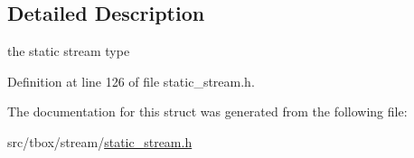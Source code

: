 \subsection{Detailed Description}
the static stream type 

Definition at line 126 of file static\-\_\-stream.\-h.



The documentation for this struct was generated from the following file\-:\begin{DoxyCompactItemize}
\item 
src/tbox/stream/\hyperlink{static__stream_8h}{static\-\_\-stream.\-h}\end{DoxyCompactItemize}
